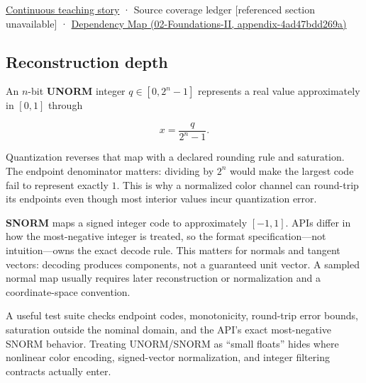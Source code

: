 \hyperref[01-foundations-i-ch001-choosing-what-information-to-keep]{Continuous teaching story} · {Source coverage ledger {[}referenced section unavailable{]}} · \href{../02-Foundations-II/main.pdf\#nameddest=appendix-4ad47bdd269a}{Dependency Map (02-Foundations-II, appendix-4ad47bdd269a)}

\subsection{Reconstruction depth}\label{appendix-b2402c453dac-reconstruction-depth}

An \(n\)-bit \textbf{UNORM} integer \(q\in[0,2^n-1]\) represents a real value approximately in \([0,1]\) through

\[
x = \frac{q}{2^n-1}.
\]

Quantization reverses that map with a declared rounding rule and saturation. The endpoint denominator matters: dividing by \(2^n\) would make the largest code fail to represent exactly \(1\). This is why a normalized color channel can round-trip its endpoints even though most interior values incur quantization error.

\textbf{SNORM} maps a signed integer code to approximately \([-1,1]\). APIs differ in how the most-negative integer is treated, so the format specification---not intuition---owns the exact decode rule. This matters for normals and tangent vectors: decoding produces components, not a guaranteed unit vector. A sampled normal map usually requires later reconstruction or normalization and a coordinate-space convention.

A useful test suite checks endpoint codes, monotonicity, round-trip error bounds, saturation outside the nominal domain, and the API's exact most-negative SNORM behavior. Treating UNORM/SNORM as ``small floats'' hides where nonlinear color encoding, signed-vector normalization, and integer filtering contracts actually enter.
